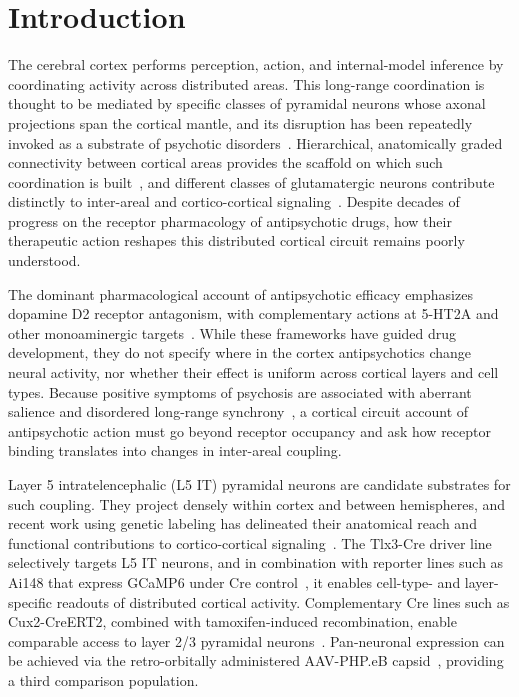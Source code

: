 \section{Introduction}

The cerebral cortex performs perception, action, and internal-model inference by coordinating activity across distributed areas. This long-range coordination is thought to be mediated by specific classes of pyramidal neurons whose axonal projections span the cortical mantle, and its disruption has been repeatedly invoked as a substrate of psychotic disorders~\cite{uhlhaas2015oscillations, uhlhaas2013highfrequency, bahner2017hippocampal}. Hierarchical, anatomically graded connectivity between cortical areas provides the scaffold on which such coordination is built~\cite{harris2019hierarchical, siegle2021survey}, and different classes of glutamatergic neurons contribute distinctly to inter-areal and cortico-cortical signaling~\cite{matho2021genetic, biccn2021multimodal, liu2024celltype}. Despite decades of progress on the receptor pharmacology of antipsychotic drugs, how their therapeutic action reshapes this distributed cortical circuit remains poorly understood.

The dominant pharmacological account of antipsychotic efficacy emphasizes dopamine D2 receptor antagonism, with complementary actions at 5-HT2A and other monoaminergic targets~\cite{howes2009dopamine, kambeitz2014alterations}. While these frameworks have guided drug development, they do not specify where in the cortex antipsychotics change neural activity, nor whether their effect is uniform across cortical layers and cell types. Because positive symptoms of psychosis are associated with aberrant salience and disordered long-range synchrony~\cite{uhlhaas2015oscillations, bahner2017hippocampal}, a cortical circuit account of antipsychotic action must go beyond receptor occupancy and ask how receptor binding translates into changes in inter-areal coupling.

Layer 5 intratelencephalic (L5 IT) pyramidal neurons are candidate substrates for such coupling. They project densely within cortex and between hemispheres, and recent work using genetic labeling has delineated their anatomical reach and functional contributions to cortico-cortical signaling~\cite{liu2024celltype, shinotsuka2023layer5, atudorei2024bilateral, matho2021genetic}. The Tlx3-Cre driver line selectively targets L5 IT neurons, and in combination with reporter lines such as Ai148 that express GCaMP6 under Cre control~\cite{daigle2018suite, chen2013ultrasensitive}, it enables cell-type- and layer-specific readouts of distributed cortical activity. Complementary Cre lines such as Cux2-CreERT2, combined with tamoxifen-induced recombination, enable comparable access to layer 2/3 pyramidal neurons~\cite{daigle2018suite}. Pan-neuronal expression can be achieved via the retro-orbitally administered AAV-PHP.eB capsid~\cite{chan2017engineered}, providing a third comparison population.

